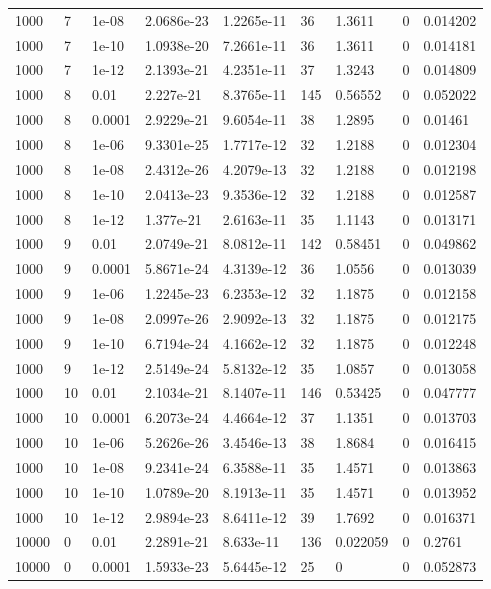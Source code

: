 \begin{tabular}{lllllllll}
1000 & 7 & 1e-08 & 2.0686e-23 & 1.2265e-11 & 36 & 1.3611 & 0 & 0.014202 \\ 
1000 & 7 & 1e-10 & 1.0938e-20 & 7.2661e-11 & 36 & 1.3611 & 0 & 0.014181 \\ 
1000 & 7 & 1e-12 & 2.1393e-21 & 4.2351e-11 & 37 & 1.3243 & 0 & 0.014809 \\ 
1000 & 8 & 0.01 & 2.227e-21 & 8.3765e-11 & 145 & 0.56552 & 0 & 0.052022 \\ 
1000 & 8 & 0.0001 & 2.9229e-21 & 9.6054e-11 & 38 & 1.2895 & 0 & 0.01461 \\ 
1000 & 8 & 1e-06 & 9.3301e-25 & 1.7717e-12 & 32 & 1.2188 & 0 & 0.012304 \\ 
1000 & 8 & 1e-08 & 2.4312e-26 & 4.2079e-13 & 32 & 1.2188 & 0 & 0.012198 \\ 
1000 & 8 & 1e-10 & 2.0413e-23 & 9.3536e-12 & 32 & 1.2188 & 0 & 0.012587 \\ 
1000 & 8 & 1e-12 & 1.377e-21 & 2.6163e-11 & 35 & 1.1143 & 0 & 0.013171 \\ 
1000 & 9 & 0.01 & 2.0749e-21 & 8.0812e-11 & 142 & 0.58451 & 0 & 0.049862 \\ 
1000 & 9 & 0.0001 & 5.8671e-24 & 4.3139e-12 & 36 & 1.0556 & 0 & 0.013039 \\ 
1000 & 9 & 1e-06 & 1.2245e-23 & 6.2353e-12 & 32 & 1.1875 & 0 & 0.012158 \\ 
1000 & 9 & 1e-08 & 2.0997e-26 & 2.9092e-13 & 32 & 1.1875 & 0 & 0.012175 \\ 
1000 & 9 & 1e-10 & 6.7194e-24 & 4.1662e-12 & 32 & 1.1875 & 0 & 0.012248 \\ 
1000 & 9 & 1e-12 & 2.5149e-24 & 5.8132e-12 & 35 & 1.0857 & 0 & 0.013058 \\ 
1000 & 10 & 0.01 & 2.1034e-21 & 8.1407e-11 & 146 & 0.53425 & 0 & 0.047777 \\ 
1000 & 10 & 0.0001 & 6.2073e-24 & 4.4664e-12 & 37 & 1.1351 & 0 & 0.013703 \\ 
1000 & 10 & 1e-06 & 5.2626e-26 & 3.4546e-13 & 38 & 1.8684 & 0 & 0.016415 \\ 
1000 & 10 & 1e-08 & 9.2341e-24 & 6.3588e-11 & 35 & 1.4571 & 0 & 0.013863 \\ 
1000 & 10 & 1e-10 & 1.0789e-20 & 8.1913e-11 & 35 & 1.4571 & 0 & 0.013952 \\ 
1000 & 10 & 1e-12 & 2.9894e-23 & 8.6411e-12 & 39 & 1.7692 & 0 & 0.016371 \\ 
10000 & 0 & 0.01 & 2.2891e-21 & 8.633e-11 & 136 & 0.022059 & 0 & 0.2761 \\ 
10000 & 0 & 0.0001 & 1.5933e-23 & 5.6445e-12 & 25 & 0 & 0 & 0.052873 \\ 

\end{tabular}

